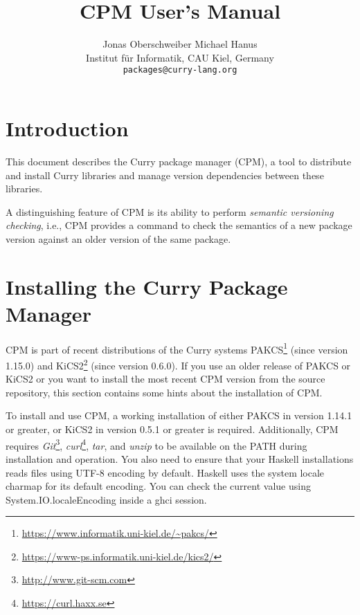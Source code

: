 \documentclass[11pt]{article}
\renewcommand{\tt}{\usefont{OT1}{cmtt}{m}{n}\selectfont}
\newcommand{\codefont}{\small\tt}
\newcommand{\code}[1]{\mbox{\codefont #1}}
\begin{document}
\title{CPM User's Manual}

\author{Jonas Oberschweiber \qquad Michael Hanus\\[1ex]
{\small Institut f\"ur Informatik, CAU Kiel, Germany}\\[1ex]
{\small\texttt{packages@curry-lang.org}}
}

\maketitle

\tableofcontents

\clearpage


\section{Introduction}

This document describes the Curry package manager (CPM), a tool to
distribute and install Curry libraries and manage version dependencies
between these libraries.

A distinguishing feature of CPM is its ability to perform
\emph{semantic versioning checking}, i.e., CPM provides a command
to check the semantics of a new package version against an
older version of the same package.


\bigskip\bigskip

\section{Installing the Curry Package Manager}

CPM is part of recent distributions of the Curry systems
PAKCS\footnote{\url{https://www.informatik.uni-kiel.de/~pakcs/}}
(since version 1.15.0)
and
KiCS2\footnote{\url{https://www-ps.informatik.uni-kiel.de/kics2/}}
(since version 0.6.0).
If you use an older release of PAKCS or KiCS2 or you want to
install the most recent CPM version from the source repository,
this section contains some hints about the installation of CPM.

To install and use CPM, a working installation of either
PAKCS in version 1.14.1 or greater, or
KiCS2 in version 0.5.1 or greater is required. Additionally, CPM requires 
\emph{Git}\footnote{\url{http://www.git-scm.com}},
\emph{curl}\footnote{\url{https://curl.haxx.se}},
\emph{tar},
and \emph{unzip} to be available on the \code{PATH} during installation and 
operation. You also need to ensure that your Haskell installations reads files
using UTF-8 encoding by default. Haskell uses the system locale charmap for its
default encoding. You can check the current value using 
\code{System.IO.localeEncoding} inside a \code{ghci} session.
\end{document}
